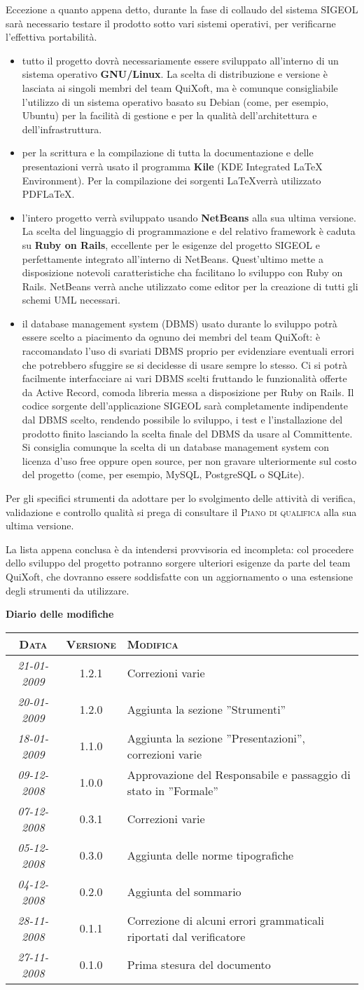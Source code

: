 \documentclass[11pt,a4paper]{article}
\newcommand{\modifiche} 
{
\newpage
\begin{center}
\textbf{Diario delle modifiche} \\
\bigskip
\begin{tabular}{|c|c|p{0.62\textwidth}|}
\hline
\textsc{Data} & \textsc{Versione} & \textsc{Modifica} \\
\hline
\hline
\textit{21-01-2009} & 1.2.1 & Correzioni varie\\
\hline
\textit{20-01-2009} & 1.2.0 & Aggiunta la sezione ''Strumenti''\\
\hline
\textit{18-01-2009} & 1.1.0 & Aggiunta la sezione ''Presentazioni'', correzioni varie\\
\hline
\textit{09-12-2008} & 1.0.0 & Approvazione del Responsabile e passaggio di stato in ''Formale''\\
\hline
\textit{07-12-2008} & 0.3.1 & Correzioni varie \\
\hline
\textit{05-12-2008} & 0.3.0 & Aggiunta delle norme tipografiche \\
\hline
\textit{04-12-2008} & 0.2.0 & Aggiunta del sommario \\
\hline
\textit{28-11-2008} & 0.1.1 & Correzione di alcuni errori grammaticali riportati dal verificatore \\
\hline
\textit{27-11-2008} & 0.1.0 & Prima stesura del documento \\
\hline
\end{tabular}
\end{center}
}
\begin{document}
Eccezione a quanto appena detto, durante la fase di collaudo del sistema SIGEOL sarà necessario testare il prodotto sotto vari sistemi operativi, per verificarne l'effettiva portabilità.
\begin{itemize}
 \item tutto il progetto dovrà necessariamente essere sviluppato all'interno di un sistema operativo \textbf{GNU/Linux}. La scelta di distribuzione e versione è lasciata ai singoli membri del team QuiXoft, ma è comunque consigliabile l'utilizzo di un sistema operativo basato su Debian (come, per esempio, Ubuntu) per la facilità di gestione e per la qualità dell'architettura e dell'infrastruttura.
 \item per la scrittura e la compilazione di tutta la documentazione e delle presentazioni verrà usato il programma \textbf{Kile} (KDE Integrated LaTeX Environment). Per la compilazione dei sorgenti \LaTeX \space verrà utilizzato PDFLaTeX.
 \item l'intero progetto verrà sviluppato usando \textbf{NetBeans} alla sua ultima versione. La scelta del linguaggio di programmazione e del relativo framework è caduta su \textbf{Ruby on Rails}, eccellente per le esigenze del progetto SIGEOL e perfettamente integrato all'interno di NetBeans. Quest'ultimo mette a disposizione notevoli caratteristiche cha facilitano lo sviluppo con Ruby on Rails. NetBeans verrà anche utilizzato come editor per la creazione di tutti gli schemi UML necessari.
 \item il database management system (DBMS) usato durante lo sviluppo potrà essere scelto a piacimento da ognuno dei membri del team QuiXoft: è raccomandato l'uso di svariati DBMS proprio per evidenziare eventuali errori che potrebbero sfuggire se si decidesse di usare sempre lo stesso.
Ci si potrà facilmente interfacciare ai vari DBMS scelti fruttando le funzionalità offerte da Active Record, comoda libreria messa a disposizione per Ruby on Rails. Il codice sorgente dell'applicazione SIGEOL sarà completamente indipendente dal DBMS scelto, rendendo possibile lo sviluppo, i test e l'installazione del prodotto finito lasciando la scelta finale del DBMS da usare al Committente. Si consiglia comunque la scelta di un database management system con licenza d'uso free oppure open source, per non gravare ulteriormente sul costo del progetto (come, per esempio, MySQL, PostgreSQL o SQLite).
\end{itemize}

Per gli specifici strumenti da adottare per lo svolgimento delle attività di verifica, validazione e controllo qualità si prega di consultare il \textsc{Piano di qualifica} alla sua ultima versione.

La lista appena conclusa è da intendersi provvisoria ed incompleta: col procedere dello sviluppo del progetto potranno sorgere ulteriori esigenze da parte del team QuiXoft, che dovranno essere soddisfatte con un aggiornamento o una estensione degli strumenti da utilizzare.


\modifiche
\end{document}
